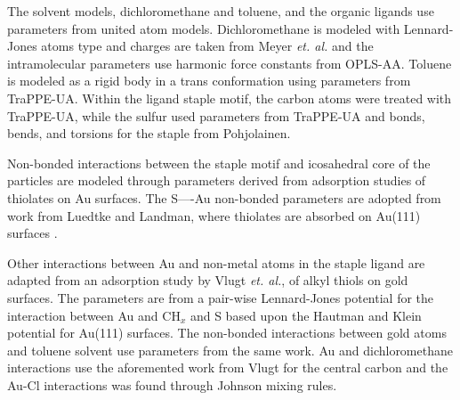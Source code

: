 The solvent models, dichloromethane and toluene, and the organic ligands use parameters from united atom models.
Dichloromethane is modeled with Lennard-Jones atoms type and charges are taken from Meyer \textit{et. al.}\cite{Meyer1978} and the intramolecular parameters use harmonic force constants from OPLS-AA.\cite{Jorgensen1998}
Toluene is modeled as a rigid body in a trans conformation using parameters from TraPPE-UA.\cite{TraPPE-UA.alkylbenzenes} %
Within the ligand staple motif, the carbon atoms were treated with TraPPE-UA,\cite{TraPPE-UA.alkanes,TraPPE-UA.alkylbenzenes,TraPPE-UA.thiols} while the sulfur used parameters from TraPPE-UA\cite{TraPPE-UA.thiols} and bonds, bends, and torsions for the staple from Pohjolainen.\cite{Pohjolainen2016}

Non-bonded interactions between the staple motif and icosahedral core of the particles are modeled through parameters derived from adsorption studies of thiolates on Au surfaces.
The S—-Au non-bonded parameters are adopted from work from Luedtke and Landman,\cite{landman:1998} where thiolates are absorbed on Au(111) surfaces .

Other interactions between Au and non-metal atoms in the staple ligand are adapted from an adsorption study by Vlugt \textit{et. al.},\cite{vlugt:cpc2007154} of alkyl thiols on gold surfaces. The parameters are from a pair-wise Lennard-Jones potential for the interaction between Au and $\mathrm{CH}_x$ and S based upon the Hautman and Klein potential for Au(111) surfaces.\cite{Klein01}
The non-bonded interactions between gold atoms and toluene solvent use parameters from the same work.
Au and dichloromethane interactions use the aforemented work from Vlugt for the central carbon and the Au-Cl interactions was found through Johnson mixing rules.\cite{Johnson89}

